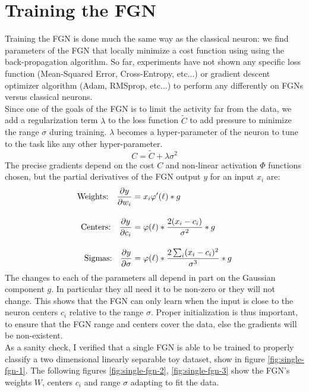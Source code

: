\documentclass[12pt,oneside]{CUNY_PhD}
\begin{document}
\section{Training the FGN}
Training the FGN is done much the same way as the classical neuron: we find parameters of the FGN that locally minimize a cost function using using the back-propagation algorithm. So far, experiments have not shown any specific loss function (Mean-Squared Error, Cross-Entropy, etc...) or gradient descent optimizer algorithm (Adam, RMSprop, etc...) to perform any differently on FGNs versus classical neurons. \\
Since one of the goals of the FGN is to limit the activity far from the data, we add a regularization term $\lambda$ to the loss function $\tilde{C}$ to add pressure to minimize the range $\sigma$ during training. $\lambda$ becomes a hyper-parameter of the neuron to tune to the task like any other hyper-parameter.\\
\[C = \tilde{C} + \lambda\sigma^2\]
The precise gradients depend on the cost $C$ and non-linear activation $\Phi$ functions chosen, but the partial derivatives of the FGN output $y$ for an input $x_i$  are:
\begin{align*}
    \text{Weights:\quad} \frac{\partial y}{\partial w_i} &=  x_i \varphi'(\ell) * g  \\[1em]
    \text{Centers:\quad} \frac{\partial y}{\partial c_i} &= \varphi(\ell) * \frac{2(x_i-c_i)}{\sigma^2} * g \\[1em]
    \text{Sigmas:\quad} \frac{\partial y}{\partial \sigma} &= \varphi(\ell) * \frac{2\sum_{i}(x_i-c_i)^2}{\sigma^3}* g
\end{align*}
The changes to each of the parameters all depend in part on the Gaussian component $g$. In particular they all need it to be non-zero or they will not change. This shows that the FGN can only learn when the input is close to the neuron centers $c_i$ relative to the range $\sigma$. Proper initialization is thus important, to ensure that the FGN range and centers cover the data, else the gradients will be non-existent. \\
\indent As a sanity check, I verified that a single FGN is able to be trained to properly classify a two dimensional linearly separable toy dataset, show in figure \ref{fig:single-fgn-1}. The following figures \ref{fig:single-fgn-2}, \ref{fig:single-fgn-3} show the FGN's weights $W$, centers $c_i$ and range $\sigma$ adapting to fit the data.
\end{document}

